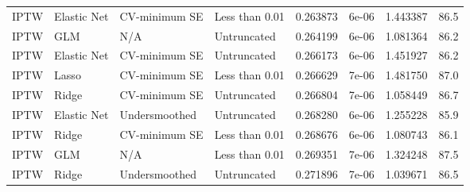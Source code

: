 \begin{longtable}[l]{llllllll}
IPTW & Elastic Net & CV-minimum SE & Less than 0.01 & 0.263873 & 6e-06 & 1.443387 & 86.5\\
IPTW & GLM & N/A & Untruncated & 0.264199 & 6e-06 & 1.081364 & 86.2\\
IPTW & Elastic Net & CV-minimum SE & Untruncated & 0.266173 & 6e-06 & 1.451927 & 86.2\\
IPTW & Lasso & CV-minimum SE & Less than 0.01 & 0.266629 & 7e-06 & 1.481750 & 87.0\\
IPTW & Ridge & CV-minimum SE & Untruncated & 0.266804 & 7e-06 & 1.058449 & 86.7\\
IPTW & Elastic Net & Undersmoothed & Untruncated & 0.268280 & 6e-06 & 1.255228 & 85.9\\
IPTW & Ridge & CV-minimum SE & Less than 0.01 & 0.268676 & 6e-06 & 1.080743 & 86.1\\
IPTW & GLM & N/A & Less than 0.01 & 0.269351 & 7e-06 & 1.324248 & 87.5\\
IPTW & Ridge & Undersmoothed & Untruncated & 0.271896 & 7e-06 & 1.039671 & 86.5\\
\bottomrule
\end{longtable}
